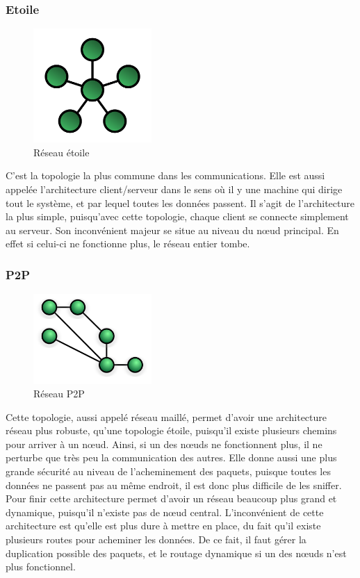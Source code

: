	    \subsubsection{Etoile}
\begin{figure}[!ht]
         \centering
         \includegraphics[width=0.4\textwidth]{img/StarNetwork.png}
         \caption{Réseau étoile}
         \label{StarNetwork}
\end{figure}
C'est la topologie la plus commune dans les communications. Elle est aussi appelée l'architecture client/serveur dans le sens où il y une machine qui dirige tout le système, et par lequel toutes les données passent. Il s'agit de l'architecture la plus simple, puisqu'avec cette topologie, chaque client se connecte simplement au serveur. Son inconvénient majeur se situe au niveau du nœud principal. En effet si celui-ci ne fonctionne plus, le réseau entier tombe.

	    \subsubsection{P2P}
\begin{figure}[!ht]
         \centering
         \includegraphics[width=0.4\textwidth]{img/NetworkTopology-Mesh.png}
         \caption{Réseau P2P}
         \label{MeshNetwork}
\end{figure}
Cette topologie, aussi appelé réseau maillé, permet d'avoir une architecture réseau plus robuste, qu'une topologie étoile, puisqu'il existe plusieurs chemins pour arriver à un nœud. Ainsi, si un des nœuds ne fonctionnent plus, il ne perturbe que très peu la communication des autres. Elle donne aussi une plus grande sécurité au niveau de l'acheminement des paquets, puisque toutes les données ne passent pas au même endroit, il est donc plus difficile de les sniffer. Pour finir cette architecture permet d'avoir un réseau beaucoup plus grand et dynamique, puisqu'il n'existe pas de nœud central. L'inconvénient de cette architecture est qu'elle est plus dure à mettre en place, du fait qu'il existe plusieurs routes pour acheminer les données. De ce fait, il faut gérer la duplication possible des paquets, et le routage dynamique si un des nœuds n'est plus fonctionnel.

